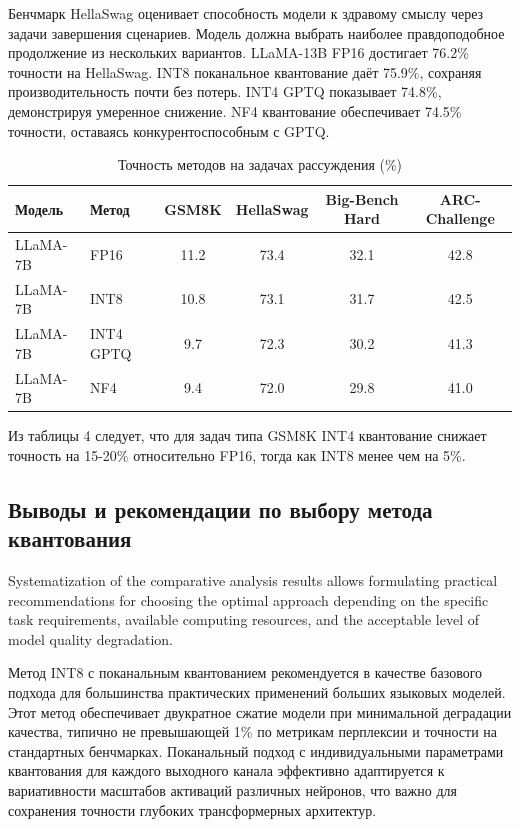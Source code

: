 \documentclass[bachelor, och, coursework]{SCWorks}
\begin{document}
	Бенчмарк HellaSwag оценивает способность модели к здравому смыслу через задачи завершения сценариев. Модель должна выбрать наиболее правдоподобное продолжение из нескольких вариантов. LLaMA-13B FP16 достигает 76.2\% точности на HellaSwag. INT8 поканальное квантование даёт 75.9\%, сохраняя производительность почти без потерь. INT4 GPTQ показывает 74.8\%, демонстрируя умеренное снижение. NF4 квантование обеспечивает 74.5\% точности, оставаясь конкурентоспособным с GPTQ.
	
	\begin{table}[!ht]
		\centering
		\small
		\caption{Точность методов на задачах рассуждения (\%)}
		\label{tab:reasoning}
		\begin{tabular}{|l|l|c|c|c|c|}
			\hline
			Модель & Метод & GSM8K & HellaSwag & Big-Bench Hard & ARC-Challenge \\
			\hline
			LLaMA-7B & FP16 & 11.2 & 73.4 & 32.1 & 42.8 \\
			\hline
			LLaMA-7B & INT8 & 10.8 & 73.1 & 31.7 & 42.5 \\
			\hline
			LLaMA-7B & INT4 GPTQ & 9.7 & 72.3 & 30.2 & 41.3 \\
			\hline
			LLaMA-7B & NF4 & 9.4 & 72.0 & 29.8 & 41.0 \\
			\hline
		\end{tabular}
	\end{table}
	
	Из таблицы 4 следует, что для задач типа GSM8K INT4 квантование снижает точность на 15-20\% относительно FP16, тогда как INT8 менее чем на 5\%.
	
	\subsection{Выводы и рекомендации по выбору метода квантования}
	
	Systematization of the comparative analysis results allows formulating practical recommendations for choosing the optimal approach depending on the specific task requirements, available computing resources, and the acceptable level of model quality degradation.
	
	Метод INT8 с поканальным квантованием рекомендуется в качестве базового подхода для большинства практических применений больших языковых моделей. Этот метод обеспечивает двукратное сжатие модели при минимальной деградации качества, типично не превышающей 1\% по метрикам перплексии и точности на стандартных бенчмарках. Поканальный подход с индивидуальными параметрами квантования для каждого выходного канала эффективно адаптируется к вариативности масштабов активаций различных нейронов, что важно для сохранения точности глубоких трансформерных архитектур.
	
\end{document}
